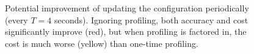 \begin{figure}[t]
    \centering
    \hspace{-0.5cm}
    \caption{Potential improvement of updating the \nn configuration periodically (every $T = 4$ seconds). Ignoring profiling, both accuracy and cost significantly improve (red), but when profiling is factored in, the cost is much worse (yellow) than one-time profiling.}
    \label{fig:potential-impr}
\end{figure}


